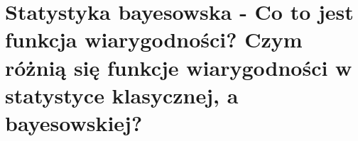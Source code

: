 \section{Statystyka bayesowska - Co to jest funkcja wiarygodności? Czym różnią się funkcje wiarygodności w statystyce klasycznej, a bayesowskiej?}
